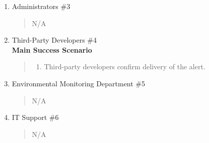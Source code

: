 \documentclass[]{article}
\begin{document}
\begin{enumerate}[{\bf BE4.}]
\begin{enumerate}[{\bf VP1.}]
			\item Administrators \#3 
				\begin{quote}
				    N/A
				\end{quote}
                
			\item Third-Party Developers \#4 \\
                \textbf{Main Success Scenario}
                    \begin{quote}
                    \begin{enumerate}[1.]
                        \item Third-party developers confirm delivery of the alert.
                    \end{enumerate}
                    \end{quote}
                
			\item Environmental Monitoring Department \#5 
				\begin{quote}
				    N/A
				\end{quote}

			\item IT Support \#6 
				\begin{quote}
				    N/A
				\end{quote}
		\end{enumerate}
        

\end{enumerate}
\end{document}
